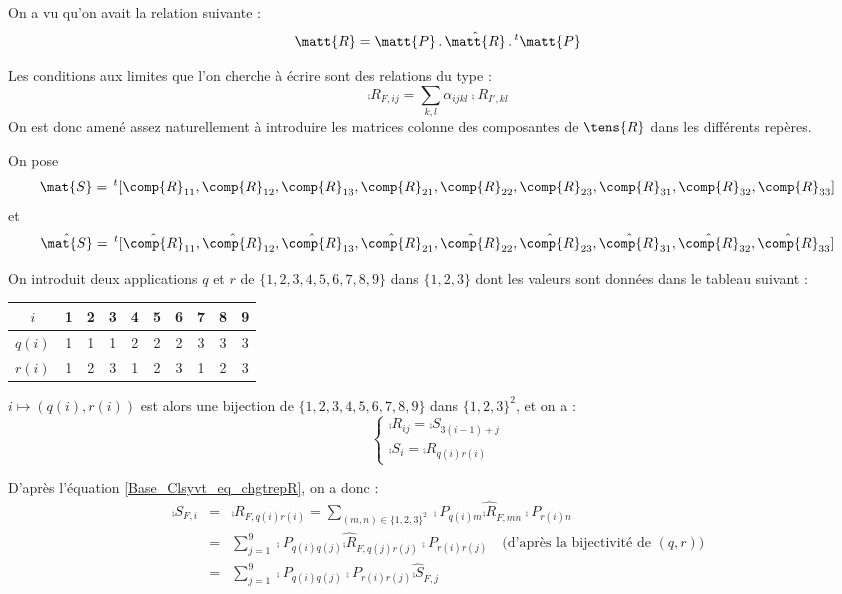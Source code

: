 \vspace{1cm}
On a vu qu'on avait la relation suivante :
\begin{equation}
\label{Base_Clsyvt_eq_chgtrepR}
\matt{R}= \matt{P}\,.\,\hat{\matt{R}}\,.\,^t\matt{P}
\end{equation}

Les conditions aux limites que l'on cherche \`a \'ecrire sont des relations du
type :
\begin{equation}
\comp{R}_{F,ij}=\sum_{k,l}\alpha_{ijkl}\comp{R}_{I',kl}
\end{equation}
On est donc amen\'e assez naturellement \`a introduire les matrices colonne des
composantes de $\tens{R}$ dans les diff\'erents rep\`eres.

On pose
\begin{equation}
\mat{S}=\,^t[\comp{R}_{11},\comp{R}_{12},\comp{R}_{13},
\comp{R}_{21},\comp{R}_{22},\comp{R}_{23},
\comp{R}_{31},\comp{R}_{32},\comp{R}_{33}]
\end{equation}
et
\begin{equation}
\hat{\mat{S}}=\,^t[\hat{\comp{R}}_{11},\hat{\comp{R}}_{12},\hat{\comp{R}}_{13},
\hat{\comp{R}}_{21},\hat{\comp{R}}_{22},\hat{\comp{R}}_{23},
\hat{\comp{R}}_{31},\hat{\comp{R}}_{32},\hat{\comp{R}}_{33}]
\end{equation}

On introduit deux applications $q$ et $r$ de $\{1,2,3,4,5,6,7,8,9\}$ dans
$\{1,2,3\}$ dont les valeurs sont donn\'ees dans le tableau suivant :
\begin{center}
\begin{tabular}{|c|c|c|c|c|c|c|c|c|c|}
\hline
$i$&1&2&3&4&5&6&7&8&9\\
\hline
$q(i)$&1&1&1&2&2&2&3&3&3\\
\hline
$r(i)$&1&2&3&1&2&3&1&2&3\\
\hline
\end{tabular}
\end{center}
$i\longmapsto (q(i),r(i))$ est alors une bijection de $\{1,2,3,4,5,6,7,8,9\}$
dans $\{1,2,3\}^2$, et on a :
\begin{equation}
\left\{\begin{array}{l}
\comp{R}_{ij}=\comp{S}_{3(i-1)+j}\\
\comp{S}_i=\comp{R}_{q(i)r(i)}
\end{array}\right.
\end{equation}

D'apr\`es l'\'equation \ref{Base_Clsyvt_eq_chgtrepR}, on a donc :
\begin{eqnarray}
\comp{S}_{F,i} & = & \comp{R}_{F,q(i)r(i)} =
\sum_{(m,n)\in\{1,2,3\}^2}\comp{P}_{q(i)m}\hat{\comp{R}}_{F,mn}\comp{P}_{r(i)n}\nonumber\\
&=&\sum_{j=1}^9\comp{P}_{q(i)q(j)}\hat{\comp{R}}_{F,q(j)r(j)}\comp{P}_{r(i)r(j)}
\quad\text{(d'apr\`es la bijectivit\'e de $(q,r)$)}\nonumber\\
&=&\sum_{j=1}^9\comp{P}_{q(i)q(j)}\comp{P}_{r(i)r(j)}\hat{\comp{S}}_{F,j}
\end{eqnarray}

